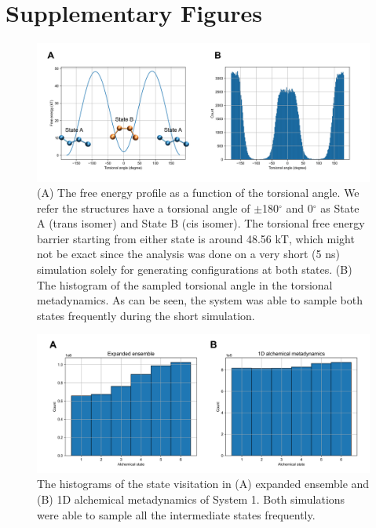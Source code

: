 \documentclass[journal=jacsat,manuscript=article]{achemso}
\begin{document}
\section{Supplementary Figures}
\renewcommand{\thefigure}{S\arabic{figure}}
\begin{figure}[H]
    \centering
    \includegraphics[width=\textwidth]{Figures/sys2_torsional_MetaD_annotated.png}   
    \caption{(A) The free energy profile as a function of the torsional angle. We refer the structures have a torsional angle of $\pm$180$^{\circ}$ and 0$^{\circ}$ as State A (trans isomer) and State B (cis isomer). The torsional free energy barrier starting from either state is around 48.56 kT, which might not be exact since the analysis was done on a very short (5 ns) simulation solely for generating configurations at both states. (B) The histogram of the sampled torsional angle in the torsional metadynamics. As can be seen, the system was able to sample both states frequently during the short simulation.}
    \label{sys2_torsional_MetaD}
\end{figure}

\renewcommand{\thefigure}{S\arabic{figure}}
\begin{figure}[H]
    \centering
    \includegraphics[width=\textwidth]{Figures/sys1_histograms.png}   
    \caption{The histograms of the state visitation in (A) expanded ensemble and (B) 1D alchemical metadynamics of System 1. Both simulations were able to sample all the intermediate states frequently.}
    \label{sys1_hist}
\end{figure}
\end{document}
